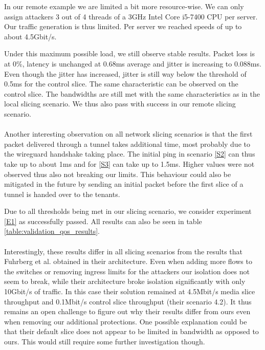 \begin{description}[style=multiline, labelwidth=0.7cm]
    In our remote example we are limited a bit more resource-wise. We can only assign attackers 3 out of 4 threads of a 3GHz Intel Core i5-7400 CPU per server. Our traffic generation is thus limited. Per server we reached speeds of up to about 4.5Gbit/s.

    Under this maximum possible load, we still observe stable results. Packet loss is at 0\%, \gls{latency} is unchanged at 0.68ms average and \gls{jitter} is increasing to 0.088ms. Even though the \gls{jitter} has increased, \gls{jitter} is still way below the threshold of 0.5ms for the control slice. The same characteristic can be observed on the control slice. The \gls{bandwidth}s are still met with the same characteristics as in the local slicing scenario. We thus also pass with success in our remote slicing scenario.

    \paragraph{} Another interesting observation on all network slicing scenarios is that the first packet delivered through a tunnel takes additional time, most probably due to the \gls{wireguard} handshake taking place. The initial ping in scenario \ref{S2} can thus take up to about 1ms and for \ref{S3} can take up to 1.5ms. Higher values were not observed thus also not breaking our limits. This behaviour could also be mitigated in the future by sending an initial packet before the first slice of a tunnel is handed over to the tenants.

    Due to all thresholds being met in our slicing scenario, we consider experiment \ref{E1} as successfully passed. All results can also be seen in table \ref{table:validation_qos_results}.

    \paragraph{} Interestingly, these results differ in all slicing scenarios from the results that Fuhrberg et al. \cite{SE4} obtained in their architecture. Even when adding more flows to the switches or removing ingress limits for the attackers our isolation does not seem to break, while their architecture broke isolation significantly with only 10Gbit/s of traffic. In this case their solution remained at 4.5Mbit/s media slice throughput and 0.1Mbit/s control slice throughput (their scenario 4.2). It thus remains an open challenge to figure out why their results differ from ours even when removing our additional protections. One possible explanation could be that their default slice does not appear to be limited in \gls{bandwidth} as opposed to ours. This would still require some further investigation though.


\end{description}
